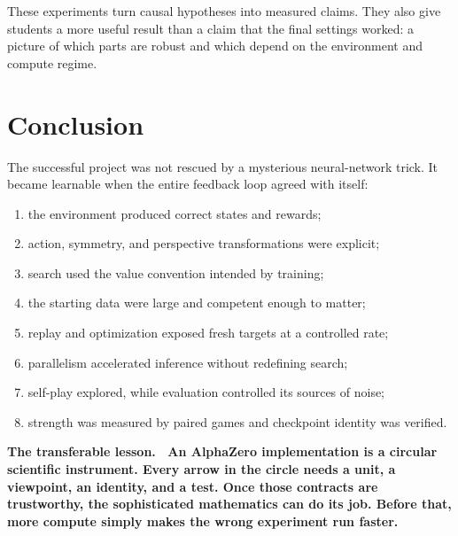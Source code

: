 \documentclass[10.5pt,letterpaper]{article}
\newcommand{\boxtitle}[1]{\sffamily\bfseries\color{deepblue}#1.\ }
\begin{document}
These experiments turn causal hypotheses into measured claims. They also give
students a more useful result than a claim that the final settings worked: a
picture of which parts are robust and which depend on the environment and
compute regime.

\section{Conclusion}

The successful project was not rescued by a mysterious neural-network trick.
It became learnable when the entire feedback loop agreed with itself:
\begin{enumerate}
  \item the environment produced correct states and rewards;
  \item action, symmetry, and perspective transformations were explicit;
  \item search used the value convention intended by training;
  \item the starting data were large and competent enough to matter;
  \item replay and optimization exposed fresh targets at a controlled rate;
  \item parallelism accelerated inference without redefining search;
  \item self-play explored, while evaluation controlled its sources of noise;
  \item strength was measured by paired games and checkpoint identity was
        verified.
\end{enumerate}

\begin{keybox}
\boxtitle{The transferable lesson}
An AlphaZero implementation is a circular scientific instrument. Every arrow in
the circle needs a unit, a viewpoint, an identity, and a test. Once those
contracts are trustworthy, the sophisticated mathematics can do its job. Before
that, more compute simply makes the wrong experiment run faster.
\end{keybox}

\appendix
\end{document}
